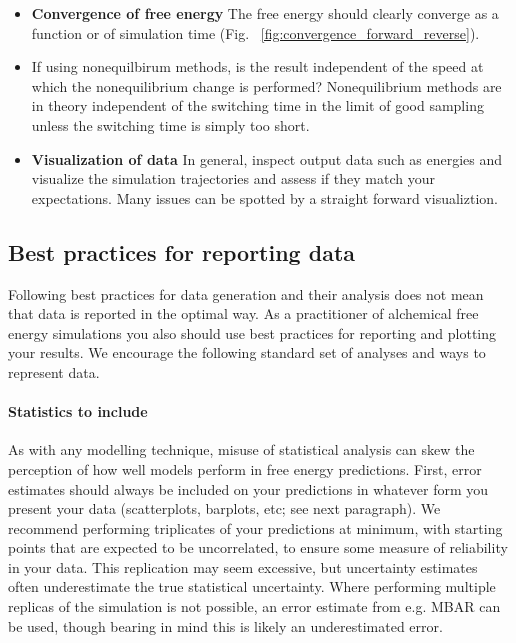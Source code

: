 \documentclass[9pt,bestpractices]{livecoms}
\begin{document}
\begin{itemize}
\item \textbf{Convergence of free energy} The free energy should clearly converge as a function or of simulation time (Fig. ~\ref{fig:convergence_forward_reverse}).
\item If using nonequilbirum methods, is the result independent of the speed at which the nonequilibrium change is performed? Nonequilibrium methods are in theory independent of the switching time in the limit of good sampling unless the switching time is simply too short. 
\item \textbf{Visualization of data} In general, inspect output data such as energies and visualize the simulation trajectories and assess if they match your expectations. Many issues can be spotted by a straight forward visualiztion. 
\end{itemize}


\subsection{Best practices for reporting data }
\label{sec:plot_data}
Following best practices for data generation and their analysis does not mean that data is reported in the optimal way. As a practitioner of alchemical free energy simulations you also should use best practices for reporting and plotting your results. We encourage the following standard set of analyses and ways to represent data. 
\paragraph{Statistics to include}
As with any modelling technique, misuse of statistical analysis can skew the perception of how well models perform in free energy predictions. First, error estimates should always be included on your predictions in whatever form you present your data (scatterplots, barplots, etc; see next paragraph). We recommend performing triplicates of your predictions at minimum, with starting points that are expected to be uncorrelated, to ensure some measure of reliability in your data. This replication may seem excessive, but uncertainty estimates often underestimate the true statistical uncertainty. Where performing multiple replicas of the simulation is not possible, an error estimate from e.g. MBAR can be used, though bearing in mind this is likely an underestimated error. 
\end{document}
